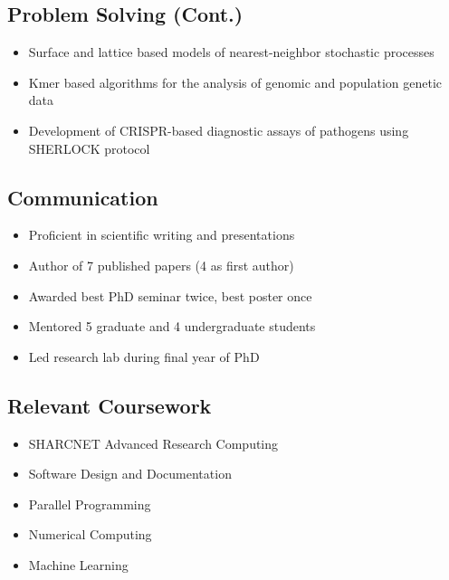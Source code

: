 \begin{multicols}{2}
\columnbreak
\subsection{Problem Solving (Cont.)}
\begin{itemize}
\item{Surface and lattice based models of nearest-neighbor stochastic processes}
\item{Kmer based algorithms for the analysis of genomic and population genetic data}
\item{Development of CRISPR-based diagnostic assays of pathogens using SHERLOCK protocol}
\end{itemize}

\subsection{Communication}
\begin{itemize}
\item{Proficient in scientific writing and presentations}
\item{Author of 7 published papers (4 as first author)}
\item{Awarded best PhD seminar twice, best poster once}
\item{Mentored 5 graduate and 4 undergraduate students}
\item{Led research lab during final year of PhD}
\end{itemize}

\subsection{Relevant Coursework}
\begin{itemize}
\item{SHARCNET Advanced Research Computing}
\item{Software Design and Documentation}
\item{Parallel Programming}
\item{Numerical Computing}
\item{Machine Learning}
\end{itemize}
\end{multicols}




